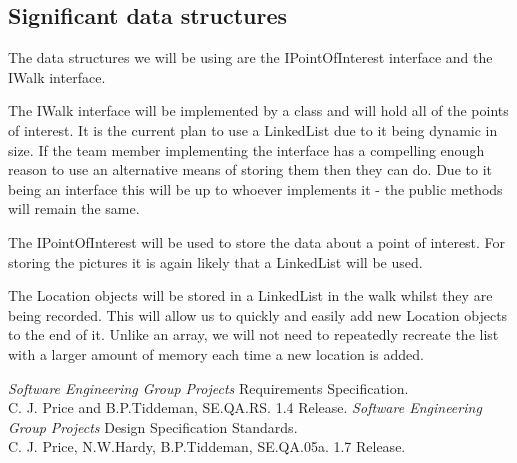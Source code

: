 \documentclass{project}
\begin{document}

\subsection{Significant data structures}
The data structures we will be using are the IPointOfInterest interface and the
IWalk interface.

The IWalk interface will be implemented by a class and will hold all of the
points of interest. It is the current plan to use a LinkedList due to it being
dynamic in size. If the team member implementing the interface has a compelling
enough reason to use an alternative means of storing them then they can do. Due
to it being an interface this will be up to whoever implements it - the public
methods will remain the same.

The IPointOfInterest will be used to store the data about a point of interest.
For storing the pictures it is again likely that a LinkedList will be used.

The Location objects will be stored in a LinkedList in the walk
whilst they are being recorded. This will allow us to quickly and easily add
new Location objects to the end of it. Unlike an array, we will not need to
repeatedly recreate the list with a larger amount of memory each time a new
location is added.

\clearpage
{}
\begin{thebibliography}{5}
 \emph{Software Engineering Group Projects}
Requirements Specification. \\
C. J. Price and B.P.Tiddeman, SE.QA.RS. 1.4 Release.
 \emph{Software Engineering Group Projects}
Design Specification Standards. \\
C. J. Price, N.W.Hardy, B.P.Tiddeman, SE.QA.05a. 1.7 Release.
\end{thebibliography}
\end{document}
